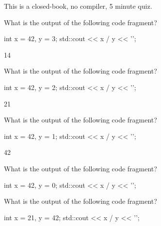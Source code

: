 

This is a closed-book, no compiler, 5 minute quiz.

\nextq
What is the output of the following code fragment?
\begin{console}[fontsize=\footnotesize]
int x = 42, y = 3;
std::cout << x / y << '\n';
\end{console}
\ANSWER
\begin{answercode}
14
\end{answercode}

\nextq
What is the output of the following code fragment?
\begin{console}[fontsize=\footnotesize]
int x = 42, y = 2;
std::cout << x / y << '\n';
\end{console}
\ANSWER
\begin{answercode}
21
\end{answercode}

\nextq
What is the output of the following code fragment?
\begin{console}[fontsize=\footnotesize]
int x = 42, y = 1;
std::cout << x / y << '\n';
\end{console}
\ANSWER
\begin{answercode}
42
\end{answercode}

\nextq
What is the output of the following code fragment?
\begin{console}[fontsize=\footnotesize]
int x = 42, y = 0;
std::cout << x / y << '\n';
\end{console}
\ANSWER
\begin{answercode}

\end{answercode}

\nextq
What is the output of the following code fragment?
\begin{console}[fontsize=\footnotesize]
int x = 21, y = 42;
std::cout << x / y << '\n';
\end{console}
\ANSWER
\begin{answercode}

\end{answercode}

